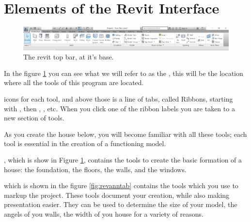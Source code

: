 \documentclass{tufte-book} %
\begin{document}
\clearpage
\section{Elements of the Revit Interface}

\begin{figure}
	\includegraphics[width=\linewidth]{revittopbar.png}
	\caption[The revit top bar]{The revit top bar, at it's base.}
	\label{fig:revtopbar.png}
\end{figure}

In the figure \ref{fig:revtopbar.png} you can see what we will refer to as the , this will be the location where all the tools of this program are located.

 
 icons for each tool, and above those is a line of tabs, called Ribbons, starting with , then , , etc. When you click one of the ribbon labels you are taken to a new section of tools. 

As you create the house below, you will become familiar with all these tools; each tool is essential in the creation of a functioning model.

, which is show in Figure \ref{fig:revtopbar.png}, contains the tools to create the basic formation of a house: the foundation, the floors, the walls, and the windows.


 which is shown in the figure \ref{fig:revanntab} contains the tools which you use to markup the project. These tools document your creation, while also making presentation easier. They can be used to determine the size of your model, the angels of you walls, the width of you house for a variety of reasons.
\end{document}

